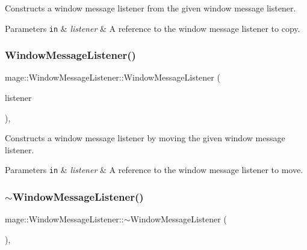 Constructs a window message listener from the given window message listener.


\begin{DoxyParams}[1]{Parameters}
\mbox{\tt in}  & {\em listener} & A reference to the window message listener to copy. \\
\hline
\end{DoxyParams}
\hypertarget{classmage_1_1_window_message_listener_a5d90d0e20cda37ee83a00696fb40f3c3}{}\label{classmage_1_1_window_message_listener_a5d90d0e20cda37ee83a00696fb40f3c3} 
\subsubsection{\texorpdfstring{Window\+Message\+Listener()}{WindowMessageListener()}\hspace{0.1cm}{\footnotesize\ttfamily [3/3]}}
{\footnotesize\ttfamily mage\+::\+Window\+Message\+Listener\+::\+Window\+Message\+Listener (\begin{DoxyParamCaption}\item[{\hyperlink{classmage_1_1_window_message_listener}{Window\+Message\+Listener} \&\&}]{listener }\end{DoxyParamCaption})\hspace{0.3cm}{\ttfamily [default]}, {\ttfamily [noexcept]}}

Constructs a window message listener by moving the given window message listener.


\begin{DoxyParams}[1]{Parameters}
\mbox{\tt in}  & {\em listener} & A reference to the window message listener to move. \\
\hline
\end{DoxyParams}
\hypertarget{classmage_1_1_window_message_listener_ae0972346e59184cb01d674dfa8269d32}{}\label{classmage_1_1_window_message_listener_ae0972346e59184cb01d674dfa8269d32} 
\subsubsection{\texorpdfstring{$\sim$\+Window\+Message\+Listener()}{~WindowMessageListener()}}
{\footnotesize\ttfamily mage\+::\+Window\+Message\+Listener\+::$\sim$\+Window\+Message\+Listener (\begin{DoxyParamCaption}{ }\end{DoxyParamCaption})\hspace{0.3cm}{\ttfamily [virtual]}, {\ttfamily [default]}}

